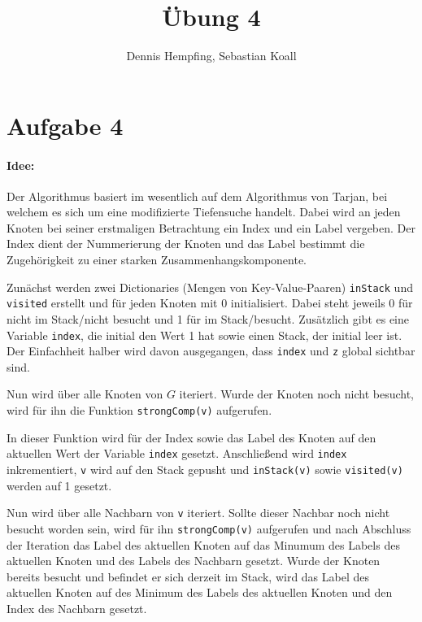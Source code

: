 \documentclass[12pt]{scrartcl}%
\theoremstyle{nonumberplain}
\newcommand{\code}[1]{\lstinline[basicstyle=\ttfamily\color{black}]{#1}}
\begin{document}
\author{Dennis Hempfing, Sebastian Koall}
\title{Übung 4}
\date{} 
\pagestyle{myheadings}

\maketitle %
 
\section*{Aufgabe 4}

\paragraph{Idee:} Der Algorithmus basiert im wesentlich auf dem Algorithmus von Tarjan, bei welchem es sich um eine modifizierte Tiefensuche handelt. Dabei wird an jeden Knoten bei seiner erstmaligen Betrachtung ein Index und ein Label vergeben. Der Index dient der Nummerierung der Knoten und das Label bestimmt die Zugehörigkeit zu einer starken Zusammenhangskomponente.

Zunächst werden zwei Dictionaries (Mengen von Key-Value-Paaren) \code{inStack} und \code{visited} erstellt und für jeden Knoten mit 0 initialisiert. Dabei steht jeweils 0 für nicht im Stack/nicht besucht und 1 für im Stack/besucht. Zusätzlich gibt es eine Variable \code{index}, die initial den Wert 1 hat sowie einen Stack, der initial leer ist. Der Einfachheit halber wird davon ausgegangen, dass \code{index} und \code{z} global sichtbar sind.

Nun wird über alle Knoten von $G$ iteriert. Wurde der Knoten noch nicht besucht, wird für ihn die Funktion \code{strongComp(v)} aufgerufen.

In dieser Funktion wird für der Index sowie das Label des Knoten auf den aktuellen Wert der Variable \code{index} gesetzt. Anschließend wird \code{index} inkrementiert, \code{v} wird auf den Stack gepusht und \code{inStack(v)} sowie \code{visited(v)} werden auf 1 gesetzt.

Nun wird über alle Nachbarn von \code{v} iteriert. Sollte dieser Nachbar noch nicht besucht worden sein, wird für ihn \code{strongComp(v)} aufgerufen und nach Abschluss der Iteration das Label des aktuellen Knoten auf das Minumum des Labels des aktuellen Knoten und des Labels des Nachbarn gesetzt. Wurde der Knoten bereits besucht und befindet er sich derzeit im Stack, wird das Label des aktuellen Knoten auf des Minimum des Labels des aktuellen Knoten und den Index des Nachbarn gesetzt. 
\end{document}
